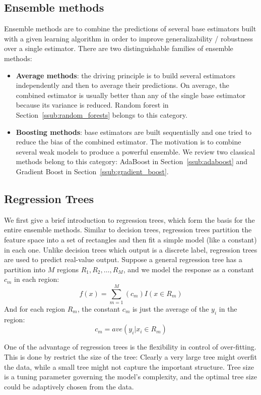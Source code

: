 \subsection{Ensemble methods}
\label{sub:ensemble_methods}
Ensemble methods are to combine the predictions of several base estimators built with a given learning algorithm in order to improve generalizability / robustness over a single estimator.
There are two distinguishable families of ensemble methods:
\begin{itemize}
	\item \textbf{Average methods}: the driving principle is to build several estimators independently and then to average their predictions. On average, the combined estimator is usually better than any of the single base estimator because its variance is reduced. Random forest in Section~\ref{ssub:random_forests} belongs to this category.
	\item \textbf{Boosting methods}: base estimators are built sequentially and one tried to reduce the bias of the combined estimator. The motivation is to combine several weak models to produce a powerful ensemble. We review two classical methods belong to this category: AdaBoost in Section~\ref{ssub:adaboost} and Gradient Boost in Section~\ref{ssub:gradient_boost}.
\end{itemize}

\subsection{Regression Trees}
\label{ssub:regression_tree}
We first give a brief introduction to regression trees, which form the basis for the entire ensemble methods.
Similar to decision trees, regression trees partition the feature space into a set of rectangles and then fit a simple model (like a constant) in each one.
Unlike decision trees which output is a discrete label, regression trees are used to predict real-value output.
Suppose a general regression tree has a partition into $M$ regions $R_1, R_2, \ldots, R_M$, and we model the response as a constant $c_m$ in each region:
\begin{equation}
	f(x) = \sum \limits_{m=1}^{M} (c_m)I(x \in R_m)
\end{equation}
And for each region $R_m$, the constant $c_m$ is just the average of the $y_i$ in the region:
\begin{equation}
	c_m  = ave(y_i | x_i \in R_m)
\end{equation}

One of the advantage of regression trees is the flexibility in control of over-fitting.
This is done by restrict the size of the tree: Clearly a very large tree might overfit the data, while a small tree might not capture the important structure.
Tree size is a tuning parameter governing the model's complexity, and the optimal tree size could be adaptively chosen from the data.

